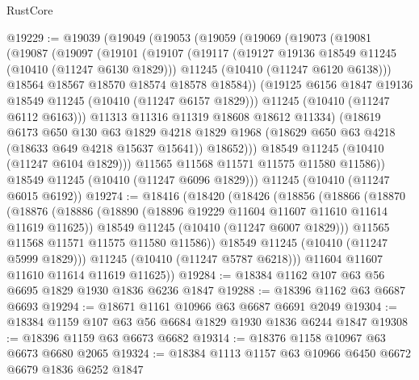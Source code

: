\begin{lexlean}{RustCore}
\begin{coremodule}
@19229 := @19039
    (@19049
      (@19053
        (@19059
          (@19069
            (@19073
              (@19081
                (@19087
                  (@19097
                    (@19101
                      (@19107
                        (@19117
                          (@19127 @19136 @18549 @11245 (@10410 (@11247 @6130 @1829)))
                          @11245
                          (@10410 (@11247 @6120 @6138)))
                        @18564
                        @18567
                        @18570
                        @18574
                        @18578
                        @18584))
                    (@19125 @6156 @1847 @19136 @18549 @11245 (@10410 (@11247 @6157 @1829)))
                    @11245
                    (@10410 (@11247 @6112 @6163)))
                  @11313
                  @11316
                  @11319
                  @18608
                  @18612
                  @11334)
                (@18619
                  @6173
                  @650
                  @130
                  @63
                  @1829
                  @4218
                  @1829
                  @1968
                  (@18629 @650 @63 @4218 (@18633 @649 @4218 @15637 @15641))
                  @18652)))
            @18549
            @11245
            (@10410 (@11247 @6104 @1829)))
          @11565
          @11568
          @11571
          @11575
          @11580
          @11586))
      @18549
      @11245
      (@10410 (@11247 @6096 @1829)))
    @11245
    (@10410 (@11247 @6015 @6192))
@19274 := @18416
    (@18420
      (@18426
        (@18856
          (@18866
            (@18870
              (@18876
                (@18886
                  (@18890 (@18896 @19229 @11604 @11607 @11610 @11614 @11619 @11625))
                  @18549
                  @11245
                  (@10410 (@11247 @6007 @1829)))
                @11565
                @11568
                @11571
                @11575
                @11580
                @11586))
            @18549
            @11245
            (@10410 (@11247 @5999 @1829)))
          @11245
          (@10410 (@11247 @5787 @6218)))
        @11604
        @11607
        @11610
        @11614
        @11619
        @11625))
@19284 := @18384 @1162 @107 @63 @56 @6695 @1829 @1930 @1836 @6236 @1847
@19288 := @18396 @1162 @63 @6687 @6693
@19294 := @18671 @1161 @10966 @63 @6687 @6691 @2049
@19304 := @18384 @1159 @107 @63 @56 @6684 @1829 @1930 @1836 @6244 @1847
@19308 := @18396 @1159 @63 @6673 @6682
@19314 := @18376 @1158 @10967 @63 @6673 @6680 @2065
@19324 := @18384 @1113 @1157 @63 @10966 @6450 @6672 @6679 @1836 @6252 @1847

\end{coremodule}
\end{lexlean}

